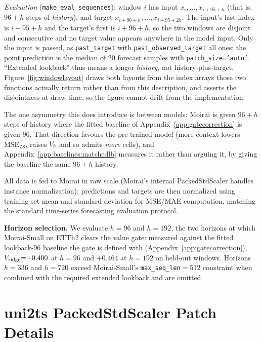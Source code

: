 \emph{Evaluation} (\texttt{make\_eval\_sequences}): window $i$ has input
$x_i,\dots,x_{i+95+h}$ (that is, $96{+}h$ steps of \emph{history}),
and target $x_{i+96+h},\dots,x_{i+95+2h}$.  The input's last index is
$i+95+h$ and the target's first is $i+96+h$, so the two windows are
disjoint and consecutive and no target value appears anywhere in the model
input.  Only the input is passed, as \texttt{past\_target} with
\texttt{past\_observed\_target} all ones; the point prediction is the
median of 20 forecast samples with \texttt{patch\_size='auto'}.
``Extended lookback'' thus means a longer \emph{history}, not
history-plus-target.  Figure~\ref{fig:windowlayout} draws both layouts
from the index arrays those two functions actually return rather than from
this description, and asserts the disjointness at draw time, so the figure
cannot drift from the implementation.

The one asymmetry this does introduce is between models: Moirai is given
$96{+}h$ steps of history where the fitted baseline of
Appendix~\ref{app:gatecorrection} is given 96.  That direction favours the
pre-trained model (more context lowers $\text{MSE}_{\text{ZS}}$, raises
$V_{b}$ and so admits \emph{more} cells), and
Appendix~\ref{app:baselines:matchedlb} measures it rather than arguing it, by
giving the baseline the same $96{+}h$ history.

All data is fed to Moirai in raw scale (Moirai's internal
PackedStdScaler handles instance normalization); predictions and targets
are then normalized using training-set mean and standard deviation
for MSE/MAE computation, matching the standard time-series forecasting
evaluation protocol.

\textbf{Horizon selection.}
We evaluate $h{=}96$ and $h{=}192$, the two horizons at which Moirai-Small on
ETTh2 clears the value gate: measured against the fitted lookback-96 baseline
the gate is defined with (Appendix~\ref{app:gatecorrection}),
$V_{\text{ridge}}{=}{+}0.400$ at $h{=}96$ and ${+}0.464$ at
$h{=}192$ on held-out windows.
Horizons $h{=}336$ and $h{=}720$ exceed Moirai-Small's
\texttt{max\_seq\_len}$=$512 constraint when combined with the
required extended lookback and are omitted.

\section{uni2ts PackedStdScaler Patch Details}
\label{app:scaler_patch}

